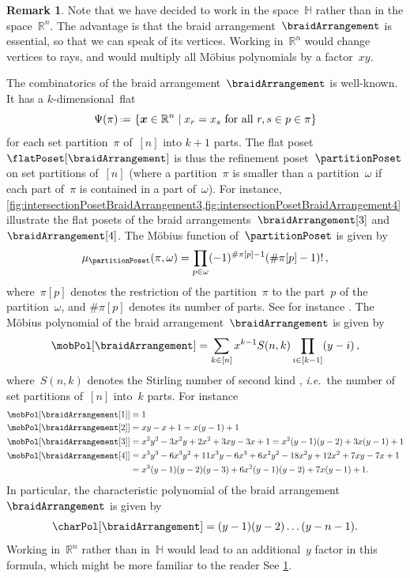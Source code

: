 \documentclass{amsart}
\newcommand{\BDO}[1]{\todo[color=green!30]{\rm #1 \\ \hfill --- B.}}
\theoremstyle{definition}
\newtheorem{remark}[theorem]{Remark}
\newcommand{\R}{\mathbb{R}} %
\renewcommand{\b}[1]{{\boldsymbol{#1}}} %
\newcommand{\set}[2]{\left\{ #1 \;\middle|\; #2 \right\}} %
\newcommand{\eqdef}{\mbox{\,\raisebox{0.2ex}{\scriptsize\ensuremath{\mathrm:}}\ensuremath{=}\,}} %
\newcommand{\ie}{\textit{i.e.}~} %
\newcommand{\OEIS}[1]{\cite[{\rm \href{http://oeis.org/#1}{\texttt{#1}}}]{OEIS}}
\renewcommand{\b}[1]{\boldsymbol{#1}} %
\newcommand{\HH}{\mathbb{H}} %
\begin{document}
\begin{remark}
\label{rem:essential}
Note that we have decided to work in the space~$\HH$ rather than in the space~$\R^n$.
The advantage is that the braid arrangement~$\braidArrangement$ is essential, so that we can speak of its vertices.
Working in~$\R^n$ would change vertices to rays, and would multiply all M\"obius polynomials by a factor~$xy$.
\end{remark}

The combinatorics of the braid arrangement~$\braidArrangement$ is well-known.
It has a $k$-dimensional~flat
\[
\Psi(\pi) \eqdef \set{\b{x} \in \R^n}{x_r = x_s \text{ for all } r, s \in p \in \pi}
\]
for each set partition~$\pi$ of~$[n]$ into $k+1$ parts.
The flat poset~$\flatPoset[\braidArrangement]$ is thus the refinement poset~$\partitionPoset$ \BDO{$\Pi_n$ ?} on set partitions of~$[n]$ (where a partition~$\pi$ is smaller than a partition~$\omega$ if each part of~$\pi$ is contained in a part of~$\omega$).
For instance, \cref{fig:intersectionPosetBraidArrangement3,fig:intersectionPosetBraidArrangement4} illustrate the flat posets of the braid arrangements~$\braidArrangement[3]$ and~$\braidArrangement[4]$.
The M\"obius function of~$\partitionPoset$ is given by
\[
\mu_{\partitionPoset}(\pi, \omega) = \prod_{p \in \omega} (-1)^{\#\pi[p]-1}(\#\pi[p]-1)! \, ,
\]
where~$\pi[p]$ denotes the restriction of the partition~$\pi$ to the part~$p$ of the partition~$\omega$, and $\#\pi[p]$ denotes its number of parts.
See for instance \cite{Birkhoff, Rota}.
The M\"obius polynomial of the braid arrangement~$\braidArrangement$ is given by
\[
\mobPol[\braidArrangement] = \sum_{k \in [n]} x^{k-1} S(n,k) \prod_{i \in [k-1]} (y-i) \, ,
\]
where~$S(n,k)$ denotes the Stirling number of second kind \OEIS{A008277}, \ie the number of set partitions of~$[n]$ into~$k$ parts.
For instance
\begin{align*}
\mobPol[{\braidArrangement[1]}] & = 1 \\
\mobPol[{\braidArrangement[2]}] & = x y - x + 1 = x (y - 1) + 1 \\
\mobPol[{\braidArrangement[3]}] & = x^2 y^2 - 3 x^2 y + 2 x^2 + 3 x y - 3 x + 1 = x^2 (y - 1) (y - 2) + 3 x (y - 1) + 1\\
\mobPol[{\braidArrangement[4]}] & = x^3 y^3 - 6 x^3 y^2 + 11 x^3 y - 6 x^3 + 6 x^2 y^2 - 18 x^2 y + 12 x^2 + 7 x y - 7 x + 1 \\
& = x^3 (y - 1) (y - 2) (y - 3) + 6 x^2 (y - 1) (y - 2) + 7 x (y - 1) + 1.
\end{align*}
In particular, the characteristic polynomial of the braid arrangement~$\braidArrangement$ is given by
\[
\charPol[\braidArrangement] = (y-1) (y-2) \dots (y-n-1).
\]
Working in~$\R^n$ rather than in~$\HH$ would lead to an additional~$y$ factor in this formula, which might be more familiar to the reader
See \cref{rem:essential}.
\end{document}
